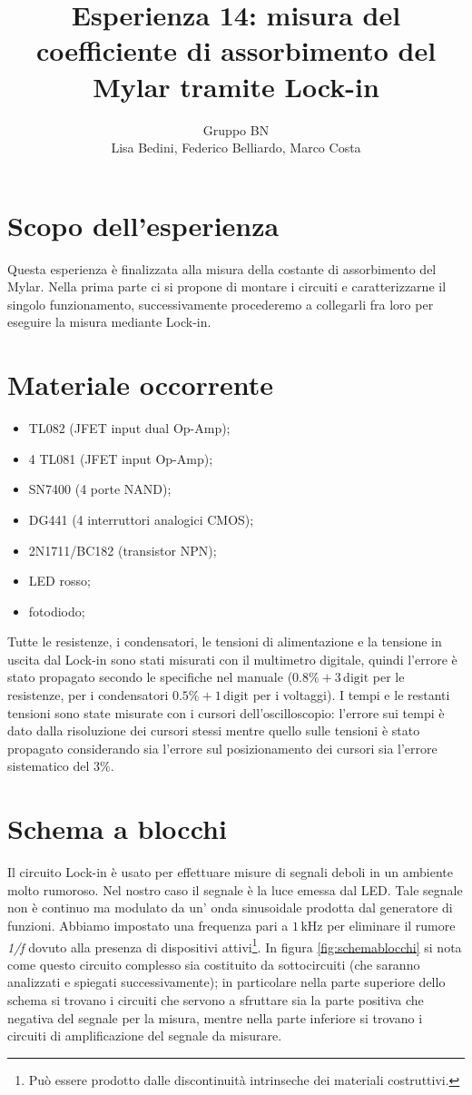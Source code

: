 \documentclass[10pt,a4paper]{article}
\author{Gruppo BN \\ Lisa Bedini, Federico Belliardo, Marco Costa}
\title{Esperienza 14: misura del coefficiente di assorbimento del Mylar tramite Lock-in}
\begin{document}
\maketitle
\section{Scopo dell'esperienza}
Questa esperienza è finalizzata alla misura della costante di assorbimento del Mylar. Nella prima parte ci si propone di montare i circuiti e caratterizzarne il singolo funzionamento, successivamente procederemo a collegarli fra loro per eseguire la misura mediante Lock-in.

\section{Materiale occorrente}
\begin{itemize}
\item TL082 (JFET input dual Op-Amp);
\item 4 TL081 (JFET input Op-Amp);
\item SN7400 (4 porte NAND);
\item DG441 (4 interruttori analogici CMOS);
\item 2N1711/BC182 (transistor NPN);
\item LED rosso;
\item fotodiodo;
\end{itemize}

Tutte le resistenze, i condensatori, le tensioni di alimentazione e la tensione in uscita dal Lock-in sono stati misurati con il multimetro digitale, quindi l'errore è stato propagato secondo le specifiche nel manuale ($0.8\% + 3\,\mbox{digit}$ per le resistenze,  per i condensatori $0.5\% + 1\,\mbox{digit}$ per i voltaggi). I tempi e le restanti tensioni sono state misurate con i cursori dell'oscilloscopio: l'errore sui tempi è dato dalla risoluzione dei cursori stessi mentre quello sulle tensioni è stato propagato considerando sia l'errore sul posizionamento dei cursori sia l'errore sistematico del $3\%$.

\section{Schema a blocchi}
Il circuito Lock-in è usato per effettuare misure di segnali deboli in un ambiente molto rumoroso. Nel nostro caso il segnale è la luce emessa dal LED. Tale segnale non è continuo ma modulato da un' onda sinusoidale prodotta dal generatore di funzioni. Abbiamo impostato una frequenza pari a $1\,\mbox{kHz}$ per eliminare il rumore \emph{1/f} dovuto alla presenza di dispositivi attivi\footnote{Può essere prodotto dalle discontinuità intrinseche dei materiali costruttivi.}. In figura \ref{fig:schemablocchi} si nota come questo circuito complesso sia costituito da sottocircuiti (che saranno analizzati e spiegati successivamente); in particolare nella parte superiore dello schema si trovano i circuiti che servono a sfruttare sia la parte positiva che negativa del segnale per la misura, mentre nella parte inferiore si trovano i circuiti di amplificazione del segnale da misurare.
\end{document}
